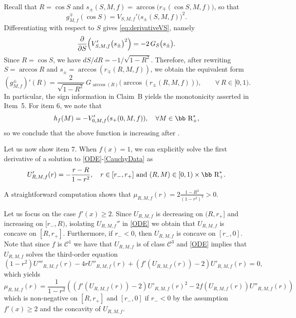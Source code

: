 \documentclass[11pt]{article}
\def\r{\hbox{\bb R}}
\numberwithin{equation} {section}
\begin{document}
Recall that $R=\cos S$ and
$s_{\pm}(S,M,f)=\arccos\bigl(r_{\mp}(\cos S,M,f)\bigr)$, so that
\[
g_{M,f}^{\mp}(\cos S)=V_{S,M,f}'\bigl(s_{\pm}(S,M,f)\bigr)^2.
\]
Differentiating with respect to $S$ gives \eqref{eq:derivativeVS}, namely
\[
\frac{\partial}{\partial S}\Bigl(V_{S,M,f}'\bigl(s_{\pm}\bigr)^2\Bigr)=-2\,G_S\bigl(s_{\pm}\bigr).
\]
Since $R=\cos S$, we have $dS/dR=-1/\sqrt{1-R^2}$. Therefore, after rewriting
$S=\arccos R$ and $s_{\pm}=\arccos(r_{\mp}(R,M,f))$, we obtain the equivalent form
\[
(g_{M,f}^\pm)'(R)
= \frac{2}{\sqrt{1-R^2}}\,
G_{\arccos(R)}\bigl(\arccos(r_\pm(R,M,f))\bigr),
\qquad \forall\, R\in[0,1).
\]
In particular, the sign information in Claim~B yields the monotonicity asserted in Item~5.
For item $6$, we note that
\[
h_f(M) = -V_{0,M,f}' (s_+ (0,M,f)), \quad \forall M \in \r_+^*,
\]
so we conclude that the above function is increasing after \cite[Subsection 3.2.3]{EM}.

Let us now show item $7$. When $f(x) =1$, we can explicitly solve the first derivative of a solution to \eqref{ODE}-\eqref{CauchyData} as 
$$U_{R,M,f}' (r) = - \frac{r-R}{1-r^2}, \quad r \in [r_- , r_+] \text{ and } (R,M) \in [0,1) \times \r_+^*.$$

A straightforward computation shows that $ \mu_{R,M,f} (r) = 2\frac{1-R^2}{(1-r^2)^3} >0$.

Let us focus on the case $f' (x)\geq 2$. Since $U_{R,M,f}$ is decreasing on $(R,r_+]$ and increasing on $[r_-,R)$, isolating $U_{R,M,f}''$ in \eqref{ODE} we obtain that $U_{R,M,f}$ is concave on $[R,r_+]$. Furthermore, if $r_-<0$, then $U_{R,M,f}$ is concave on $[r_-,0]$. Note that since $f$ is $\mathcal{C}^1$ we have that $U_{R,M,f}$ is of class $\mathcal{C}^3$ and \eqref{ODE} implies that $U_{R,M,f}$ solves the third-order equation
\begin{equation}\label{ThirdDerivative}
	(1-r^2)U''' _{R,M,f}(r)-4rU'' _{R,M,f}(r)+(f'(U_{R,M,f}(r))-2) U'_{R,M,f} (r)=0, 
\end{equation}which yields
$$ \mu_{R,M,f} (r) = \frac{1}{1-r^2}\left( (f'(U_{R,M,f}(r))-2) U'_{R,M,f} (r)^2 -2 f(U_{R,M,f} (r))U''_{R,M,f} (r)\right)$$which is non-negative on $[R,r_+]$ and $[r_-,0]$ if $r_- <0 $ by the assumption $f ' (x)\geq 2 $ and the concavity of $U_{R,M,f}$. 
\end{document}
